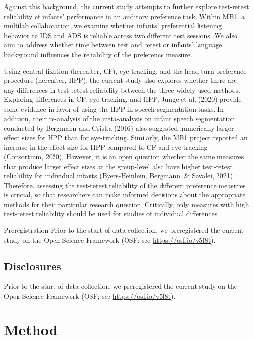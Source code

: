 \documentclass[
  english,
  man,floatsintext]{apa6}
\begin{document}
Against this background, the current study attempts to further explore test-retest reliability of infants' performance in an auditory preference task. Within MB1, a multilab collaboration, we examine whether infants' preferential listening behavior to IDS and ADS is reliable across two different test sessions. We also aim to address whether time between test and retest or infants' language background influences the reliability of the preference measure.

Using central fixation (hereafter, CF), eye-tracking, and the head-turn preference procedure (hereafter, HPP), the current study also explores whether there are any differences in test-retest reliability between the three widely used methods. Exploring differences in CF, eye-tracking, and HPP, Junge et al. (2020) provide some evidence in favor of using the HPP in speech segmentation tasks. In addition, their re-analysis of the meta-analysis on infant speech segmentation conducted by Bergmann and Cristia (2016) also suggested numerically larger effect sizes for HPP than for eye-tracking. Similarly, the MB1 project reported an increase in the effect size for HPP compared to CF and eye-tracking (Consortium, 2020). However, it is an open question whether the same measures that produce larger effect sizes at the group-level also have higher test-retest reliability for individual infants (Byers-Heinlein, Bergmann, \& Savalei, 2021). Therefore, assessing the test-retest reliability of the different preference measures is crucial, so that researchers can make informed decisions about the appropriate methods for their particular research question. Critically, only measures with high test-retest reliability should be used for studies of individual differences.

Preregistration
Prior to the start of data collection, we preregistered the current study on the Open Science Framework (OSF; see \url{https://osf.io/v5f8t}).

\hypertarget{disclosures}{%
\subsection{Disclosures}\label{disclosures}}

Prior to the start of data collection, we preregistered the current study on the Open Science Framework (OSF; see \url{https://osf.io/v5f8t}).

\hypertarget{method}{%
\section{Method}\label{method}}
\end{document}

